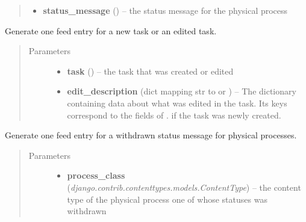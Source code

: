 \documentclass[a4paper,11pt,english]{sphinxmanual}
\begin{document}
\begin{fulllineitems}
\begin{fulllineitems}
\begin{quote}
\begin{description}
\begin{itemize}
\item {} 
\textbf{status\_message} () -- the status message for the physical process

\end{itemize}

\end{description}\end{quote}

\end{fulllineitems}


\begin{fulllineitems}
\label{programming/utilities:samples.utils.views.Reporter.report_task}
Generate one feed entry for a new task or an edited task.
\begin{quote}\begin{description}
\item[{Parameters}] \leavevmode\begin{itemize}
\item {} 
\textbf{task} () -- the task that was created or edited

\item {} 
\textbf{edit\_description} (dict mapping str to  or ) -- The dictionary containing data about what was
edited in the task.  Its keys correspond to the fields of
{\hyperref[programming/utilities:samples.utils.views.EditDescriptionForm]{}}.  if the task
was newly created.

\end{itemize}

\end{description}\end{quote}

\end{fulllineitems}


\begin{fulllineitems}
\label{programming/utilities:samples.utils.views.Reporter.report_withdrawn_status_message}
Generate one feed entry for a withdrawn status message for physical
processes.
\begin{quote}\begin{description}
\item[{Parameters}] \leavevmode\begin{itemize}
\item {} 
\textbf{process\_class} (\emph{django.contrib.contenttypes.models.ContentType}) -- the content type of the physical process one of
whose statuses was withdrawn


\end{itemize}
\end{description}
\end{quote}
\end{fulllineitems}
\end{fulllineitems}
\end{document}
